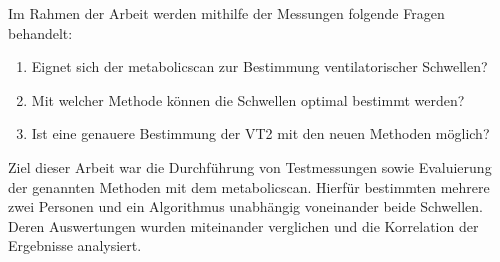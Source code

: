 Im Rahmen der Arbeit werden mithilfe der Messungen folgende Fragen behandelt:
%
\begin{enumerate}
	\item Eignet sich der metabolicscan zur Bestimmung ventilatorischer Schwellen?
	\item Mit welcher Methode können die Schwellen optimal bestimmt werden?
	\item Ist eine genauere Bestimmung der VT2 mit den neuen Methoden möglich?
\end{enumerate}
%
Ziel dieser Arbeit war die Durchführung von Testmessungen sowie Evaluierung der genannten Methoden mit dem metabolicscan. Hierfür bestimmten mehrere zwei Personen und ein Algorithmus unabhängig voneinander beide Schwellen. Deren Auswertungen wurden miteinander verglichen und die Korrelation der Ergebnisse analysiert.
\clearpage